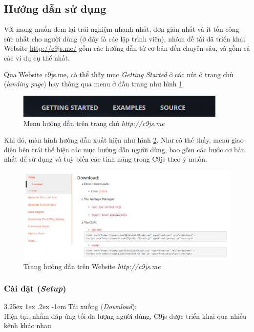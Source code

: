 \documentclass[12pt,a4paper]{article}
\makeatletter
\newcommand{\myparagraph}[1]{\paragraph{#1}\mbox{}\\} %
\renewcommand\paragraph{\@startsection{paragraph}{5}{\z@}%
  {3.25ex \@plus1ex \@minus.2ex}%
  {-1em}%
  {\normalfont\normalsize\bfseries}}
\makeatother
\begin{document}
\subsection{Hướng dẫn sử dụng}
Với mong muốn đem lại trải nghiệm nhanh nhất, đơn giản nhất và ít tốn công sức nhất cho người dùng (ở đây là các lập trình viên), nhóm đề tài đã triển khai Website \url{http://c9js.me/} gồm các hướng dẫn từ cơ bản đến chuyên sâu, và gồm cả các ví dụ cụ thể nhất. 

Qua Website c9js.me, có thể thấy mục \textit{Getting Started} ở các nút ở trang chủ (\textit{landing page}) hay thông qua menu ở đầu trang như hình \ref{fig:getting_started}

\begin{figure}[!h]
	\begin{center}
    \includegraphics[scale=.8]{image/getting_started}
    \caption{Menu hướng dẫn trên trang chủ \textit{http://c9js.me}}
    \label{fig:getting_started}
	\end{center}
\end{figure}

Khi đó, màn hình hướng dẫn xuất hiện như hình \ref{fig:gs_1}. Như có thể thấy, menu giao diện bên trái thể hiện các mục hướng dẫn người dùng, bao gồm các bước cơ bản nhất để sử dụng và tuỳ biến các tính năng trong C9js theo ý muốn.
\begin{figure}[!h]
	\begin{center}
    \includegraphics[scale=.5]{image/gs_1}
    \caption{Trang hướng dẫn trên Website \textit{http://c9js.me}}
    \label{fig:gs_1}
	\end{center}
\end{figure}

\subsubsection{Cài đặt (\textit{Setup})}
\myparagraph{Tải xuống (\textit{Download}):}
Hiện tại, nhằm đáp ứng tối đa lượng người dùng, C9js được triển khai qua nhiều kênh khác nhau
\end{document}
